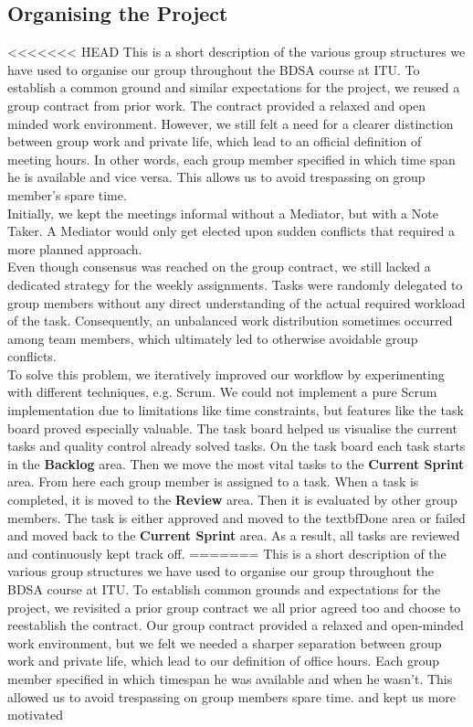 \subsection{Organising the Project}
<<<<<<< HEAD
This is a short description of the various group structures we have used to organise our group throughout the BDSA course at ITU. To establish a common ground and similar expectations for the project, we reused a group contract from prior work. The contract provided a relaxed and open minded work environment. However, we still felt a need for a clearer distinction between group work and private life, which lead to an official definition of meeting hours. In other words, each group member specified in which time span he is available and vice versa. This allows us to avoid trespassing on group member's spare time. \\  
Initially, we kept the meetings informal without a Mediator,  but with a Note Taker. A Mediator would only get elected upon sudden conflicts that required a more planned approach. 
\\ Even though consensus was reached on the group contract, we still lacked a dedicated strategy for the weekly assignments. Tasks were randomly delegated to group members without any direct understanding of the actual required workload of the task. Consequently, an unbalanced work distribution sometimes occurred among team members, which ultimately led to otherwise avoidable group conflicts. 
\\
To solve this problem, we iteratively improved our workflow by experimenting with  different techniques, e.g. Scrum. We could not implement a pure Scrum implementation due to limitations like time constraints, but features like the task board proved especially valuable. The task board helped us visualise the current tasks and quality control already solved tasks. On the task board each task starts in the \textbf{Backlog} area. Then we move the most vital tasks to the \textbf{Current Sprint} area. From here each group member is assigned to a task. When a task is completed, it is moved to the \textbf{Review} area. Then it is evaluated by other group members. The task is either approved and moved to the textbf{Done} area or failed and moved back to the \textbf{Current Sprint} area. As a result, all tasks are reviewed and continuously kept track off. 
=======
This is a short description of the various group structures we have used to organise our group throughout the BDSA course at ITU. To establish common grounds and expectations for the project, we revisited a prior group contract we all prior agreed too and choose to reestablish the contract. Our group contract provided a relaxed and open-minded work environment, but we felt we needed a sharper separation between group work and private life, which lead to our definition of office hours. Each group member specified in which timespan he was available and when he wasn't.  This allowed us to avoid trespassing on group members spare time. and kept us more motivated\\  
